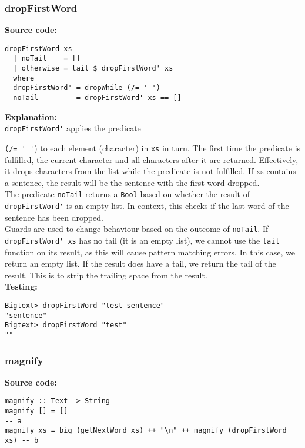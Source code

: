 \documentclass[11pt]{article}
\begin{document}
\subsubsection{dropFirstWord}
\textbf{Source code:}
\begin{verbatim}
dropFirstWord xs
  | noTail    = []                        
  | otherwise = tail $ dropFirstWord' xs  
  where 
  dropFirstWord' = dropWhile (/= ' ')
  noTail         = dropFirstWord' xs == []        
\end{verbatim}

\textbf{Explanation:}\\
{\verb|dropFirstWord'|} applies the predicate {\verb|(/= ' '|) to each element (character) in {\verb|xs|} in turn. The first time the predicate is fulfilled, the current character and all characters after it are returned. Effectively, it drops characters from the list while the predicate is not fulfilled. If xs contains a sentence, the result will be the sentence with the first word dropped.\\

The predicate {\verb|noTail|} returns a {\verb|Bool|} based on whether the result of {\verb|dropFirstWord'|} is an empty list. In context, this checks if the last word of the sentence has been dropped.\\

Guards are used to change behaviour based on the outcome of {\verb|noTail|}. If {\verb|dropFirstWord' xs|} has no tail (it is an empty list), we cannot use the {\verb|tail|} function on its result, as this will cause pattern matching errors. In this case, we return an empty list. If the result does have a tail, we return the tail of the result. This is to strip the trailing space from the result.\\

\newpage
\textbf{Testing:}
\begin{verbatim}
Bigtext> dropFirstWord "test sentence"
"sentence"
Bigtext> dropFirstWord "test"
""
\end{verbatim}

\subsubsection{magnify}
\textbf{Source code:}
\begin{verbatim}
magnify :: Text -> String
magnify [] = []                                                         -- a
magnify xs = big (getNextWord xs) ++ "\n" ++ magnify (dropFirstWord xs) -- b     
\end{verbatim}

}
\end{document}
